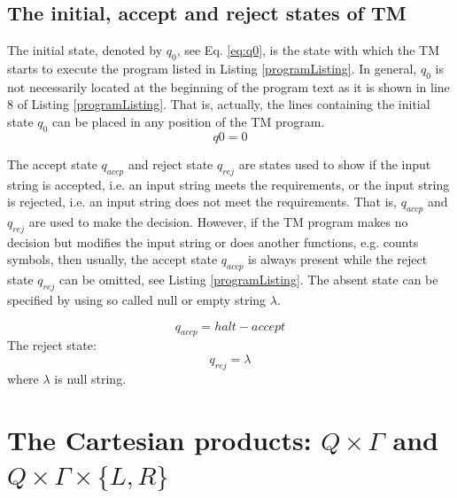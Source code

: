 \documentclass[12pt, a4paper]{report}
\begin{document}
	\subsection{The initial, accept and reject states of TM}
	{The initial state, denoted by $ q_0 $, see Eq. \eqref{eq:q0}, is the state with which the TM starts to execute the program listed in Listing \ref{programListing}. In general, $ q_0 $ is not necessarily located at the beginning of the program text as it is shown in line $ 8 $ of Listing \ref{programListing}. That is, actually, the lines containing the initial state $ q_0 $ can be placed in any position of the TM program.
	\begin{equation} \label{eq:q0}
		q0 = 0
	\end{equation}
	
	The accept state $ q_{accp} $ and reject state $ q_{rej} $ are states used to show if the input string is accepted, i.e. an input string meets the requirements, or the input string is rejected, i.e. an input string does not meet the requirements. That is, $ q_{accp} $ and $ q_{rej} $ are used to make the decision. However, if the TM program makes no decision but modifies the input string or does another functions, e.g. counts symbols, then usually, the accept state $ q_{accp} $ is always present  while the reject state $ q_{rej} $ can be omitted, see Listing \ref{programListing}. The absent state can be specified by using so called null or empty string $ \lambda $.
	
	\begin{equation}
		q_{accp} = halt-accept
	\end{equation}
	{The reject state:}
	\begin{equation}\label{eq:q_rej}
			q_{rej} = \lambda
	\end{equation}
	where $\lambda$ is null string.
	

	\section{The Cartesian products: $Q \times \Gamma$ and $ Q \times \Gamma \times \{L, R\} $}
	
}
\end{document}
